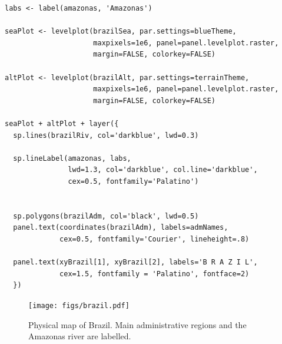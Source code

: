 
\lstset{language=R}
\begin{lstlisting}
labs <- label(amazonas, 'Amazonas')

seaPlot <- levelplot(brazilSea, par.settings=blueTheme,
                     maxpixels=1e6, panel=panel.levelplot.raster,
                     margin=FALSE, colorkey=FALSE)

altPlot <- levelplot(brazilAlt, par.settings=terrainTheme,
                     maxpixels=1e6, panel=panel.levelplot.raster,
                     margin=FALSE, colorkey=FALSE)

seaPlot + altPlot + layer({
  sp.lines(brazilRiv, col='darkblue', lwd=0.3)

  sp.lineLabel(amazonas, labs, 
               lwd=1.3, col='darkblue', col.line='darkblue',
               cex=0.5, fontfamily='Palatino')


  sp.polygons(brazilAdm, col='black', lwd=0.5)
  panel.text(coordinates(brazilAdm), labels=admNames,
             cex=0.5, fontfamily='Courier', lineheight=.8)

  panel.text(xyBrazil[1], xyBrazil[2], labels='B R A Z I L',
             cex=1.5, fontfamily = 'Palatino', fontface=2)
  })
\end{lstlisting}

\begin{figure}[htb]
\centering
\texttt{[image: figs/brazil.pdf]}
\caption{\label{fig:brazil}Physical map of Brazil. Main administrative regions and the Amazonas river are labelled.}
\end{figure}
